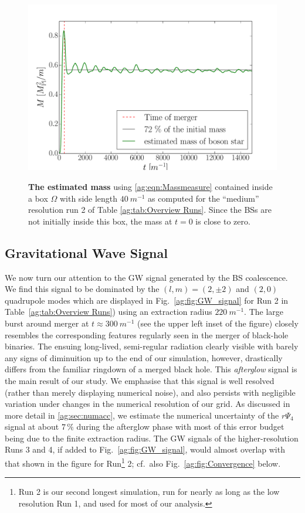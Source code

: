\begin{figure}[h!]
\begin{center}
    {\includegraphics[width=0.7\columnwidth]{ag_fig/mass_over_time.pdf}}
    \caption{{\bf The estimated mass} using \ref{ag:eqn:Massmeasure}
    contained inside a box $\Omega$ with side length $40~m^{-1}$ as computed for the ``medium''
    resolution run 2 of Table \ref{ag:tab:Overview Runs}.
    Since the BSs are
    not initially inside this box, the mass at $t = 0$ is close to zero.
   }
\label{ag:fig:energy}
\end{center}
\end{figure}







\subsection{Gravitational Wave Signal}\label{ag:sec:GWs}



We now turn our attention to the GW signal generated by the
BS coalescence. We find this signal to be dominated by the
$(l,m)=(2,\pm 2)$ and $(2,0)$ quadrupole modes which are
displayed in Fig.~\ref{ag:fig:GW_signal} for Run 2 in Table~\ref{ag:tab:Overview Runs}) using an extraction
radius $220~m^{-1}$. The large burst around merger at $t\approx300~m^{-1}$ (see the upper left inset of the figure)
closely resembles the corresponding features
regularly seen in the merger of black-hole binaries.
The ensuing long-lived, semi-regular radiation clearly visible
with barely any signs of diminuition up to the end of our
simulation, however, drastically
differs from the familiar ringdown of a merged black hole. This
{\it afterglow} signal is the main result of our study. We
emphasise that this signal is well resolved (rather than
merely displaying numerical noise), and also persists with
negligible variation under changes in the numerical resolution
of our grid. As discussed in more detail in
\ref{ag:sec:numacc}, we estimate the numerical uncertainty
of the $r\Psi_4$ signal at about $7\,\%$ during the afterglow phase
with most of this error budget being due to the finite extraction radius.
The GW signals of the higher-resolution Runs 3 and 4, if added
to Fig.~\ref{ag:fig:GW_signal}, would almost overlap with
that shown in the figure for Run\footnote{Run 2 is our second longest simulation, run for nearly as long as the low resolution Run 1,
and used for most of our analysis.} 2;
cf.~also Fig.~\ref{ag:fig:Convergence} below.

